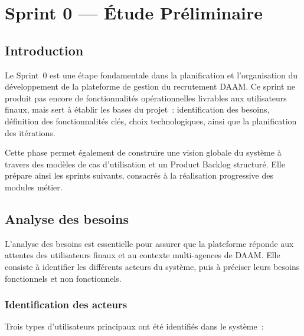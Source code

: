 \chapter{Sprint 0 --- Étude Préliminaire}

\section{Introduction}

Le Sprint~0 est une étape fondamentale dans la planification et l'organisation
du développement de la plateforme de gestion du recrutement DAAM. Ce sprint
ne produit pas encore de fonctionnalités opérationnelles livrables aux utilisateurs
finaux, mais sert à établir les bases du projet~: identification des besoins,
définition des fonctionnalités clés, choix technologiques, ainsi que la
planification des itérations.

Cette phase permet également de construire une vision globale du système à
travers des modèles de cas d'utilisation et un Product Backlog structuré. Elle
prépare ainsi les sprints suivants, consacrés à la réalisation progressive des
modules métier.


\section{Analyse des besoins}

L'analyse des besoins est essentielle pour assurer que la plateforme réponde
aux attentes des utilisateurs finaux et au contexte multi-agences de DAAM.
Elle consiste à identifier les différents acteurs du système, puis à préciser
leurs besoins fonctionnels et non fonctionnels.


\subsection{Identification des acteurs}

Trois types d'utilisateurs principaux ont été identifiés dans le système~:

